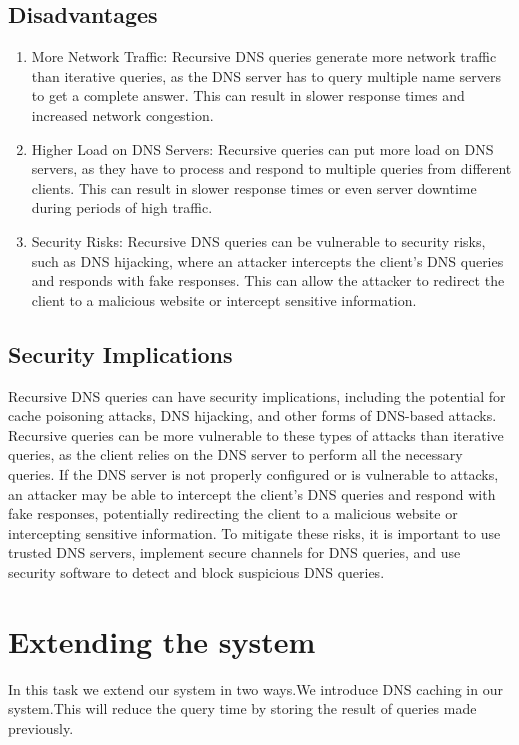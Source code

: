 \documentclass[11pt]{article}
\begin{document}
\subsection{Disadvantages}
\begin{enumerate}
\item More Network Traffic: Recursive DNS queries generate more network traffic than iterative queries, as the DNS server has to query multiple name servers to get a complete answer. This can result in slower response times and increased network congestion.
\item Higher Load on DNS Servers: Recursive queries can put more load on DNS servers, as they have to process and respond to multiple queries from different clients. This can result in slower response times or even server downtime during periods of high traffic.
\item Security Risks: Recursive DNS queries can be vulnerable to security risks, such as DNS hijacking, where an attacker intercepts the client’s DNS queries and responds with fake responses. This can allow the attacker to redirect the client to a malicious website or intercept sensitive information.
\end{enumerate}

\subsection{Security Implications}
Recursive DNS queries can have security implications, including the potential for cache poisoning attacks, DNS hijacking, and other forms of DNS-based attacks. Recursive queries can be more vulnerable to these types of attacks than iterative queries, as the client relies on the DNS server to perform all the necessary queries. If the DNS server is not properly configured or is vulnerable to attacks, an attacker may be able to intercept the client’s DNS queries and respond with fake responses, potentially redirecting the client to a malicious website or intercepting sensitive information. To mitigate these risks, it is important to use trusted DNS servers, implement secure channels
for DNS queries, and use security software to detect and block suspicious DNS queries.


\section{Extending the system}

In this task we extend our system in two ways.We introduce DNS caching in our system.This will reduce the query time by storing the result of queries made previously. 
\end{document}
